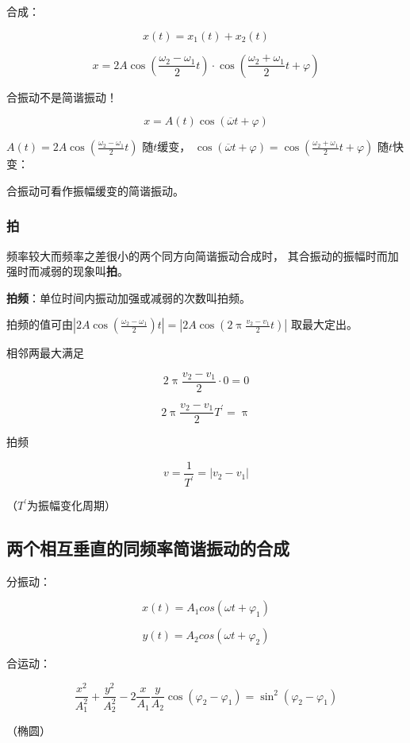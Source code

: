 \documentclass[12pt, a4paper]{article}
\numberwithin{equation}{section}
\begin{document}
    合成：

    \[
        x\left(t\right) = x_1\left(t\right) + x_2\left(t\right)
    \]

    \begin{equation}
        x=2 A \cos \left(\frac{\omega_2-\omega_1}{2} t\right) \cdot \cos \left(\frac{\omega_2+\omega_1}{2} t+\varphi\right)
    \end{equation}

    合振动不是简谐振动！

    $$
        x=A(t) \cos (\overline{\omega} t+\varphi)
    $$

    $A(t)=2 A \cos \left(\frac{\omega_2-\omega_1}{2} t\right)$
    随\(t \)缓变，
    $\cos (\overline{\omega} t+\varphi)=\cos \left(\frac{\omega_2+\omega_1}{2} t+\varphi\right)$
    随\(t \)快变：

    合振动可看作振幅缓变的简谐振动。

\subsubsection{拍}

    频率较大而频率之差很小的两个同方向简谐振动合成时，
    其合振动的振幅时而加强时而减弱的现象叫\textbf{拍}。

    \textbf{拍频}：单位时间内振动加强或减弱的次数叫拍频。

    拍频的值可由$\left|2 A \cos \left(\frac{\omega_2-\omega_1}{2}\right) t\right|=\left|2 A \cos \left(2 \uppi \frac{v_2-v_1}{2} t\right)\right|$
    取最大定出。

    相邻两最大满足

    $$
        2 \uppi \frac{v_2-v_1}{2} \cdot 0=0
    $$

    $$
        2 \uppi \frac{v_2-v_1}{2}T^{\prime}=\uppi
    $$

    拍频

    \begin{equation}
        v=\frac{1}{T^{\prime}}=\left|v_2-v_1\right|
    \end{equation}

    （\(T^{\prime}\)为振幅变化周期）

\subsection{两个相互垂直的同频率简谐振动的合成}

    分振动：

    \[
        x\left(t\right) = A_1 cos\left(\omega t + \varphi_1\right)
    \]

    \[
        y\left(t\right) = A_2 cos\left(\omega t + \varphi_2\right)
    \]

    合运动：

    \begin{equation}
        \frac{x^2}{A_1^2}+\frac{y^2}{A_2^2}-2 \frac{x}{A_1} \frac{y}{A_2} \cos \left(\varphi_2-\varphi_1\right)=\sin ^2\left(\varphi_2-\varphi_1\right)
    \end{equation}

    （椭圆）
\end{document}
